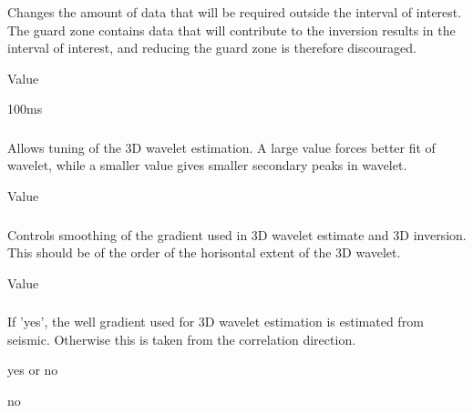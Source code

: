 \subsubsection{}
\slist
   \item \Description Changes the amount of data that will be required
     outside the interval of interest. The guard zone contains data
     that will contribute to the inversion results in the interval of
     interest, and reducing the guard zone is therefore discouraged.
   \item \Argument Value
   \item \Default 100ms
\elist

\subsubsection{}
\slist
   \item \Description Allows tuning of the 3D wavelet estimation. A
   large value forces better fit of wavelet, while a smaller value
   gives smaller secondary peaks in wavelet.
   \item \Argument Value
   \item {}
\elist

\subsubsection{}
\slist
   \item \Description Controls smoothing of the gradient used in 3D
     wavelet estimate and 3D inversion. This should be of the order of
     the horisontal extent of the 3D wavelet.
   \item \Argument Value
   \item {}
\elist

\subsubsection{}
\slist
   \item \Description If 'yes', the well gradient used for 3D wavelet
     estimation is estimated from seismic. Otherwise this is taken
     from the correlation direction.
   \item \Argument yes or no
   \item \Default no
\elist

